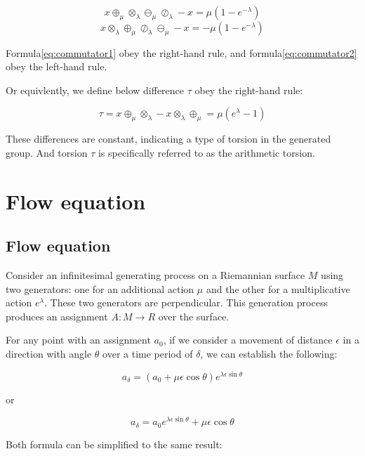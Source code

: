 \documentclass{article}
\numberwithin{definition}{section}
\numberwithin{lemma}{section}
\numberwithin{proposition}{section}
\numberwithin{corollary}{section}
\numberwithin{theorem}{section}
\begin{document}
\begin{equation}
    x \oplus_\mu \otimes_\lambda \ominus_\mu \oslash_\lambda - x = \mu(1 - e^{-\lambda})\label{eq:commutator1}
\end{equation}
\begin{equation}
    x \otimes_\lambda \oplus_\mu \oslash_\lambda \ominus_\mu - x = - \mu(1 - e^{-\lambda})\label{eq:commutator2}
\end{equation}

Formula\ref{eq:commutator1} obey the right-hand rule, and formula\ref{eq:commutator2} obey the left-hand rule.

Or equivlently, we define below difference $\tau$ obey the right-hand rule:

\begin{equation}
    \tau = x \oplus_\mu \otimes_\lambda - x \otimes_\lambda \oplus_\mu = \mu(e^\lambda - 1)\label{eq:torsion}
\end{equation}

These differences are constant, indicating a type of torsion in the generated group.
And torsion $\tau$ is specifically referred to as the arithmetic torsion.

\section{Flow equation}\label{sec:flowequation}

\subsection{Flow equation}\label{sec:equation}

Consider an infinitesimal generating process on a Riemannian surface $M$ using two generators:
one for an additional action $\mu$ and the other for a multiplicative action $e^\lambda$.
These two generators are perpendicular.
This generation process produces an assignment $A: M \to R$ over the surface.

For any point with an assignment $a_0$, if we consider a movement of distance $\epsilon$ in a direction with angle $\theta$
over a time period of $\delta$, we can establish the following:

\[
    a_{\delta} = (a_0 + \mu \epsilon \cos \theta)e^{\lambda \epsilon \sin \theta}
\]

or

\[
    a_{\delta} = a_0 e^{\lambda \epsilon \sin \theta} + \mu \epsilon \cos \theta
\]

Both formula can be simplified to the same result:
\end{document}
